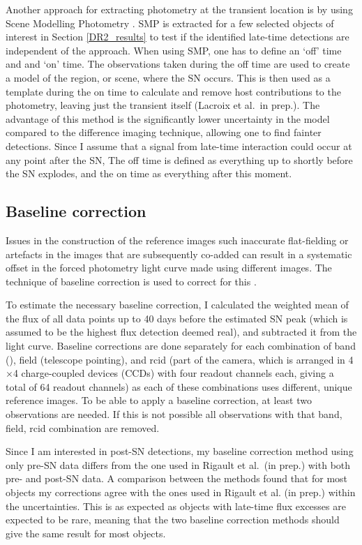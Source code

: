 \documentclass[a4paper,oneside,12pt, class=Latex/Classes/PhDthesisPSnPDF, crop=false]{standalone}
\begin{document}
Another approach for extracting photometry at the transient location is by using Scene Modelling Photometry \citep[SMP;][]{Holtzmann_SMP}. SMP is extracted for a few selected objects of interest in Section \ref{DR2_results} to test if the identified late-time detections are independent of the approach. When using SMP, one has to define an `off' time and and `on' time. The observations taken during the off time are used to create a model of the region, or scene, where the SN occurs. This is then used as a template during the on time to calculate and remove host contributions to the photometry, leaving just the transient itself (Lacroix et al.~in prep.). The advantage of this method is the significantly lower uncertainty in the model compared to the difference imaging technique, allowing one to find fainter detections. Since I assume that a signal from late-time interaction could occur at any point after the SN, The off time is defined as everything up to shortly before the SN explodes, and the on time as everything after this moment.


\subsection{Baseline correction}
 Issues in the construction of the reference images such inaccurate flat-fielding or artefacts in the images that are subsequently co-added can result in a systematic offset in the forced photometry light curve made using different images. The technique of baseline correction is used to correct for this \citep{Yao_baseline_corr,Miller_baseline_corr}. 

To estimate the necessary baseline correction, I calculated the weighted mean of the flux of all data points up to 40 days before the estimated SN peak (which is assumed to be the highest flux detection deemed real), and subtracted it from the light curve. Baseline corrections are done separately for each combination of band (\ztfg\ztfr\ztfi), field (telescope pointing), and rcid (part of the camera, which is arranged in 4$\times$4 charge-coupled devices (CCDs) with four readout channels each, giving a total of 64 readout channels) as each of these combinations uses different, unique reference images. To be able to apply a baseline correction, at least two observations are needed. If this is not possible all observations with that band, field, rcid combination are removed.

Since I am interested in post-SN detections, my baseline correction method using only pre-SN data differs from the one used in Rigault et al.~(in prep.) with both pre- and post-SN data. A comparison between the methods found that for most objects my corrections agree with the ones used in Rigault et al. (in prep.) within the uncertainties. This is as expected as objects with late-time flux excesses are expected to be rare, meaning that the two baseline correction methods should give the same result for most objects. 
\end{document}
